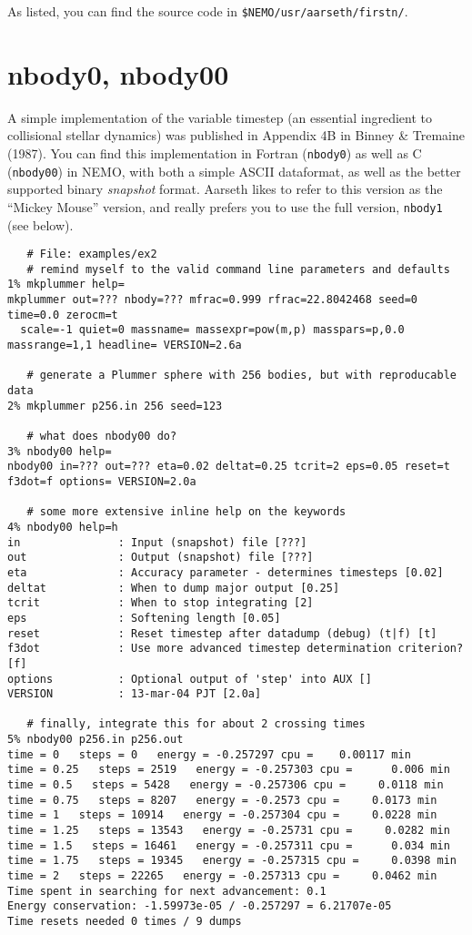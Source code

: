 As listed, you can find the source code in {\tt \$NEMO/usr/aarseth/firstn/}.

\section{nbody0, nbody00}

A simple implementation of the variable timestep (an essential ingredient
to collisional stellar dynamics) was published in Appendix 4B in
Binney \& Tremaine (1987). 
You can find this implementation in Fortran ({\tt nbody0})
as well as C ({\tt nbody00}) in NEMO, with both a simple ASCII dataformat,
as well as the better supported binary {\it snapshot} format. Aarseth likes
to refer to this version as the ``Mickey Mouse'' version, and really prefers
you to use the full version, {\tt nbody1} (see below).


\footnotesize\begin{verbatim}
   # File: examples/ex2
   # remind myself to the valid command line parameters and defaults
1% mkplummer help=
mkplummer out=??? nbody=??? mfrac=0.999 rfrac=22.8042468 seed=0 time=0.0 zerocm=t 
  scale=-1 quiet=0 massname= massexpr=pow(m,p) masspars=p,0.0 massrange=1,1 headline= VERSION=2.6a

   # generate a Plummer sphere with 256 bodies, but with reproducable data
2% mkplummer p256.in 256 seed=123

   # what does nbody00 do?
3% nbody00 help=
nbody00 in=??? out=??? eta=0.02 deltat=0.25 tcrit=2 eps=0.05 reset=t f3dot=f options= VERSION=2.0a

   # some more extensive inline help on the keywords
4% nbody00 help=h
in               : Input (snapshot) file [???]
out              : Output (snapshot) file [???]
eta              : Accuracy parameter - determines timesteps [0.02]
deltat           : When to dump major output [0.25]
tcrit            : When to stop integrating [2]
eps              : Softening length [0.05]
reset            : Reset timestep after datadump (debug) (t|f) [t]
f3dot            : Use more advanced timestep determination criterion? [f]
options          : Optional output of 'step' into AUX []
VERSION          : 13-mar-04 PJT [2.0a]

   # finally, integrate this for about 2 crossing times
5% nbody00 p256.in p256.out
time = 0   steps = 0   energy = -0.257297 cpu =    0.00117 min
time = 0.25   steps = 2519   energy = -0.257303 cpu =      0.006 min
time = 0.5   steps = 5428   energy = -0.257306 cpu =     0.0118 min
time = 0.75   steps = 8207   energy = -0.2573 cpu =     0.0173 min
time = 1   steps = 10914   energy = -0.257304 cpu =     0.0228 min
time = 1.25   steps = 13543   energy = -0.25731 cpu =     0.0282 min
time = 1.5   steps = 16461   energy = -0.257311 cpu =      0.034 min
time = 1.75   steps = 19345   energy = -0.257315 cpu =     0.0398 min
time = 2   steps = 22265   energy = -0.257313 cpu =     0.0462 min
Time spent in searching for next advancement: 0.1
Energy conservation: -1.59973e-05 / -0.257297 = 6.21707e-05
Time resets needed 0 times / 9 dumps


\end{verbatim}\normalsize

